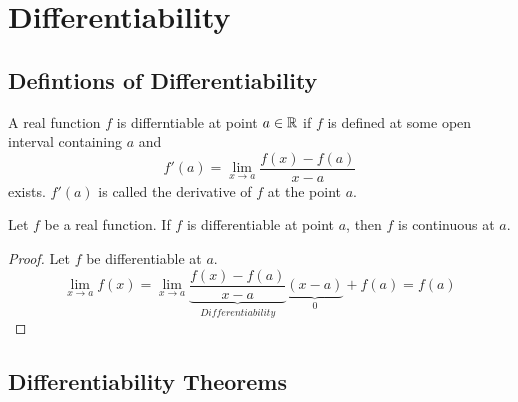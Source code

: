 \documentclass[../note.tex]{subfiles}
\begin{document}
\section{Differentiability}

\subsection{Defintions of Differentiability}

\begin{definition}[Differentiability]
	A real function $f$ is differntiable at point $a \in \mathbb{R}$ if $f$ is defined at some open interval containing $a$ and 
	\begin{equation}
		f'(a) = \lim_{x \to a} \frac{f(x)-f(a)}{x-a}
	\end{equation}
	exists. $f'(a)$ is called the derivative of $f$ at the point $a$.
\end{definition}

\begin{theorem}
	Let $f$ be a real function. If $f$ is differentiable at point $a$, then $f$ is continuous at $a$.
\end{theorem}

\begin{proof}
	Let $f$ be differentiable at $a$. 
	\[
		\lim_{x \to a}f(x)=
		\lim_{x \to a} \underbrace{\frac{f(x)-f(a)}{x-a}}_{Differentiability}
		\underbrace{(x-a)}_{0}
		+f(a) 
		= f(a)
	\]
\end{proof}


\subsection{Differentiability Theorems}

\end{document}
